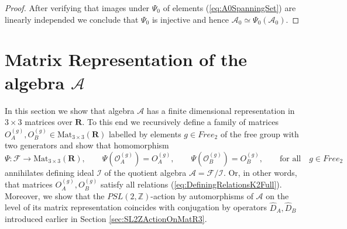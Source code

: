 \documentclass{amsart}
\begin{document}
\begin{proof}
After verifying that images under $\Psi_0$ of elements (\ref{eq:A0SpanningSet}) are linearly independed we conclude that $\Psi_0$ is injective and hence $\mathcal A_0\simeq\Psi_0(\mathcal A_0)$.
\end{proof}

\section{Matrix Representation of the algebra $\mathcal A$}
\label{sec:MatrixRepresentation}

In this section we show that algebra $\mathcal A$ has a finite dimensional representation in $3\times3$ matrices over $\mathbf R$. To this end we recursively define a family of matrices $O_A^{(g)},O_B^{(g)}\in\mathrm{Mat}_{3\times 3}(\mathbf R)$ labelled by elements $g\in Free_2$ of the free group with two generators and show that homomorphism
\begin{equation*}
\Psi:\mathcal F\rightarrow\mathrm{Mat}_{3\times 3}(\mathbf R),\qquad \Psi(\mathcal O_A^{(g)})=O_A^{(g)},\qquad \Psi(\mathcal O_B^{(g)})=O_B^{(g)},\qquad \textrm{for all}\quad g\in Free_2
\end{equation*}
annihilates defining ideal $\mathcal I$ of the quotient algebra $\mathcal A=\mathcal F/\mathcal I$. Or, in other words, that matrices $O_A^{(g)},O_B^{(g)}$ satisfy all relations (\ref{eq:DefiningRelationsK2Full}). Moreover, we show that the $PSL(2,\mathbb Z)$-action by automorphisms of $\mathcal A$ on the level of its matrix representation coincides with conjugation by operators $\widehat D_A,\widehat D_B$ introduced earlier in Section \ref{sec:SL2ZActionOnMatR3}.
\end{document}

